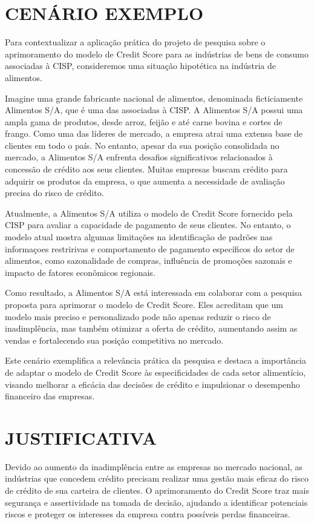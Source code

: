 \documentclass[12pt,a4paper]{article}
\begin{document}
\section{CENÁRIO EXEMPLO}
Para contextualizar a aplicação prática do projeto de pesquisa sobre o aprimoramento do modelo de Credit Score para as indústrias de bens de consumo associadas à CISP, consideremos uma situação hipotética na indústria de alimentos.

Imagine uma grande fabricante nacional de alimentos, denominada ficticiamente Alimentos S/A, que é uma das associadas à CISP. A  Alimentos S/A possui uma ampla gama de produtos, desde arroz, feijão e até carne bovina e cortes de frango. Como uma das líderes de mercado, a empresa atrai uma extensa base de clientes em todo o país.
No entanto, apesar da sua posição consolidada no mercado, a Alimentos S/A enfrenta desafios significativos relacionados à concessão de crédito aos seus clientes. Muitas empresas buscam crédito para adquirir os produtos da empresa, o que aumenta a necessidade de avaliação precisa do risco de crédito.

Atualmente, a Alimentos S/A utiliza o modelo de Credit Score fornecido pela CISP para avaliar a capacidade de pagamento de seus clientes. No entanto, o modelo atual mostra algumas limitações na identificação de padrões nas informaçoes restririvas e comportamento de pagamento específicos do setor de alimentos, como sazonalidade de compras, influência de promoções sazonais e impacto de fatores econômicos regionais.

Como resultado, a Alimentos S/A está interessada em colaborar com a pesquisa proposta para aprimorar o modelo de Credit Score. Eles acreditam que um modelo mais preciso e personalizado pode não apenas reduzir o risco de inadimplência, mas também otimizar a oferta de crédito, aumentando assim as vendas e fortalecendo sua posição competitiva no mercado.

Este cenário exemplifica a relevância prática da pesquisa e destaca a importância de adaptar o modelo de Credit Score às especificidades de cada setor alimentício, visando melhorar a eficácia das decisões de crédito e impulsionar o desempenho financeiro das empresas.
\section{JUSTIFICATIVA}
Devido ao aumento da inadimplência entre as empresas no mercado nacional, as indústrias que concedem crédito precisam realizar uma gestão mais eficaz do risco de crédito de sua carteira de clientes. O aprimoramento do Credit Score traz mais segurança e assertividade na tomada de decisão, ajudando a identificar potenciais riscos e proteger os interesses da empresa contra possíveis perdas financeiras.
\end{document}
